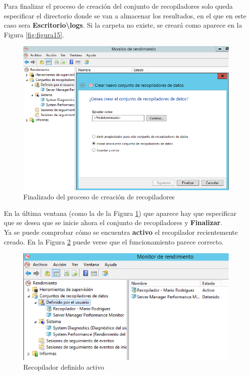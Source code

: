 	Para finalizar el proceso de creación del conjunto de recopiladores solo queda especificar el directorio donde se van a almacenar los resultados, en el que en este caso sera \textbf{Escritorio\textbackslash logs}. Si la carpeta no existe, se creará como aparece en la Figura \ref{fig:figura15}.

	\begin{figure}[H] %
		\centering
		\includegraphics[scale=0.55]{figuras/figura16.png} 
		\caption{Finalizado del proceso de creación de recopiladores} 
		\label{fig:figura16}
	\end{figure}

	En la última ventana (como la de la Figura \ref{fig:figura16}) que aparece hay que especificar que se desea que se inicie ahora el conjunto de recopiladores y \textbf{Finalizar}.
	\\
	
	Ya se puede comprobar cómo se encuentra \textbf{activo} el recopilador recientemente creado. En la Figura \ref{fig:figura17} puede verse que el funcionamiento parece correcto.
	
	\begin{figure}[H] %
		\centering
		\includegraphics[scale=0.8]{figuras/figura17.png} 
		\caption{Recopilador definido activo} 
		\label{fig:figura17}
	\end{figure}
	

